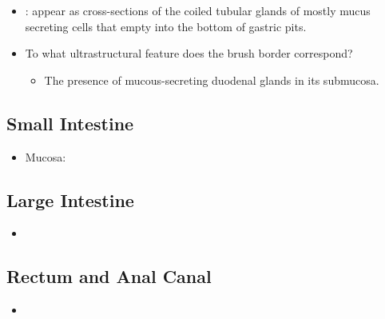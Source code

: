 \begin{itemize}
\begin{multicols}{2}
\begin{itemize}
    \item {}: appear as cross-sections of the coiled tubular glands of mostly mucus secreting cells that empty into the bottom of gastric pits. 
    
    \begin{center}
    \end{center}

  \end{itemize}
  \end{multicols}
  \begin{itemize}
    \item To what ultrastructural feature does the brush border correspond?
      \begin{itemize}
        \item The presence of mucous-secreting duodenal glands in its submucosa.
      \end{itemize}
  \end{itemize}

  \subsection{Small Intestine}\label{Small Intestine}
  \begin{multicols}{2}
  \begin{itemize}
    \item Mucosa: 
  \end{itemize}
  \end{multicols}
  
  \subsection{Large Intestine}\label{Large Intestine}
  \begin{multicols}{2}
  \begin{itemize}
    \item 
  \end{itemize}
  \end{multicols}

  \subsection{Rectum and Anal Canal}\label{Rectum and Anal Canal}
  \begin{multicols}{2}
  \begin{itemize}
    \item 
  \end{itemize}
  \end{multicols}
  

\end{itemize}
